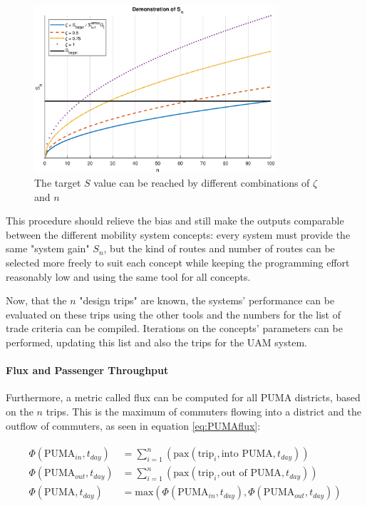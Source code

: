 \begin{figure}
    \centering
    \includegraphics[width=0.8\textwidth]{Figures/S_nDemo.eps}
    \captionsetup{justification=centering}
    \caption{The target $S$ value can be reached by different combinations of $\zeta$ and $n$}
    \label{fig:zeta_n_demo}
\end{figure}


This procedure should relieve the bias and still make the outputs comparable between the different mobility system concepts: every system must provide the same "system gain" $S_n$, but the kind of routes and number of routes can be selected more freely to suit each concept while keeping the programming effort reasonably low and using the same tool for all concepts.

Now, that the $n$ "design trips" are known, the systems' performance can be evaluated on these trips using the other tools and the numbers for the list of trade criteria can be compiled. Iterations on the concepts' parameters can be performed, updating this list and also the trips for the UAM system.


\paragraph{Flux and Passenger Throughput}

 Furthermore, a metric called flux can be computed for all PUMA districts, based on the $n$ trips. This is the maximum of commuters flowing into a district and the outflow of commuters, as seen in equation \ref{eq:PUMAflux}:

\begin{align} \label{eq:PUMAflux}
    \begin{split}
    \Phi(\text{PUMA}_{in}, t_{day}) &= \sum_{i=1}^n{ \left( \text{pax}(\text{trip}_i, \text{into   PUMA}, t_{day})\right)}\\
    \Phi(\text{PUMA}_{out}, t_{day}) &= \sum_{i=1}^n{ \left( \text{pax}(\text{trip}_i, \text{out of PUMA}, t_{day})\right)}\\
    \Phi(\text{PUMA}, t_{day}) &= \text{max} 
    \left(
        \Phi(\text{PUMA}_{in}, t_{day}),
        \Phi(\text{PUMA}_{out}, t_{day})
    \right)
    \end{split}
\end{align}

